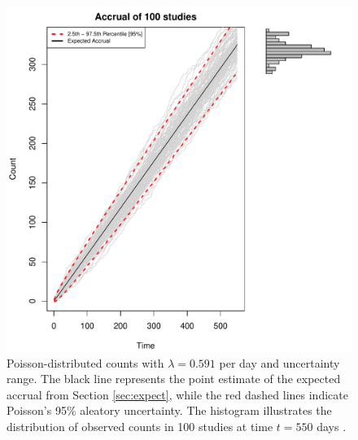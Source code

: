 \begin{figure}
\begin{knitrout}
\color{fgcolor}

{\centering \includegraphics[width=\textwidth-3cm]{figure/ch02_figunnamed-chunk-3-1} 

}


\end{knitrout}
  \caption{Poisson-distributed counts with $\lambda = 0.591$ per day and uncertainty range. The black line represents the point estimate of the expected accrual from Section \ref{sec:expect}, while the red dashed lines indicate Poisson's 95\% aleatory uncertainty. The histogram illustrates the distribution of observed counts in 100 studies at time $t = 550$ days \citep{spiegelhalter2011visualizing, pkgacc}.}
  \label{fig:2_2}
\end{figure}


